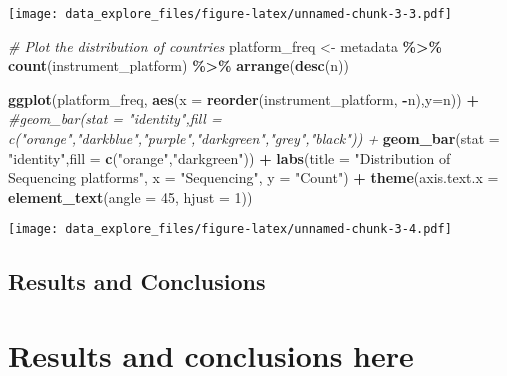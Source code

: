 \documentclass[
]{article}
\newenvironment{Shaded}{\begin{snugshade}}{\end{snugshade}}
\newcommand{\AttributeTok}[1]{\textcolor[rgb]{0.13,0.29,0.53}{#1}}
\newcommand{\CommentTok}[1]{\textcolor[rgb]{0.56,0.35,0.01}{\textit{#1}}}
\newcommand{\DecValTok}[1]{\textcolor[rgb]{0.00,0.00,0.81}{#1}}
\newcommand{\FunctionTok}[1]{\textcolor[rgb]{0.13,0.29,0.53}{\textbf{#1}}}
\newcommand{\NormalTok}[1]{#1}
\newcommand{\OtherTok}[1]{\textcolor[rgb]{0.56,0.35,0.01}{#1}}
\newcommand{\SpecialCharTok}[1]{\textcolor[rgb]{0.81,0.36,0.00}{\textbf{#1}}}
\newcommand{\StringTok}[1]{\textcolor[rgb]{0.31,0.60,0.02}{#1}}
\begin{document}
\texttt{[image: data\_explore\_files/figure-latex/unnamed-chunk-3-3.pdf]}

\begin{Shaded}
\begin{Highlighting}[]
\CommentTok{\# Plot the distribution of countries}
\NormalTok{platform\_freq }\OtherTok{\textless{}{-}}\NormalTok{ metadata }\SpecialCharTok{\%\textgreater{}\%}
  \FunctionTok{count}\NormalTok{(instrument\_platform) }\SpecialCharTok{\%\textgreater{}\%}
  \FunctionTok{arrange}\NormalTok{(}\FunctionTok{desc}\NormalTok{(n))}

\FunctionTok{ggplot}\NormalTok{(platform\_freq, }\FunctionTok{aes}\NormalTok{(}\AttributeTok{x =} \FunctionTok{reorder}\NormalTok{(instrument\_platform, }\SpecialCharTok{{-}}\NormalTok{n),}\AttributeTok{y=}\NormalTok{n)) }\SpecialCharTok{+}
  \CommentTok{\#geom\_bar(stat = "identity",fill = c("orange","darkblue","purple","darkgreen","grey","black")) +}
  \FunctionTok{geom\_bar}\NormalTok{(}\AttributeTok{stat =} \StringTok{"identity"}\NormalTok{,}\AttributeTok{fill =} \FunctionTok{c}\NormalTok{(}\StringTok{"orange"}\NormalTok{,}\StringTok{"darkgreen"}\NormalTok{)) }\SpecialCharTok{+}
  \FunctionTok{labs}\NormalTok{(}\AttributeTok{title =} \StringTok{"Distribution of Sequencing platforms"}\NormalTok{, }\AttributeTok{x =} \StringTok{"Sequencing"}\NormalTok{, }\AttributeTok{y =} \StringTok{"Count"}\NormalTok{) }\SpecialCharTok{+}
  \FunctionTok{theme}\NormalTok{(}\AttributeTok{axis.text.x =} \FunctionTok{element\_text}\NormalTok{(}\AttributeTok{angle =} \DecValTok{45}\NormalTok{, }\AttributeTok{hjust =} \DecValTok{1}\NormalTok{))}
\end{Highlighting}
\end{Shaded}

\texttt{[image: data\_explore\_files/figure-latex/unnamed-chunk-3-4.pdf]}

\hypertarget{results-and-conclusions}{%
\subsection{Results and Conclusions}\label{results-and-conclusions}}

\hypertarget{results-and-conclusions-here}{%
\section{Results and conclusions
here}\label{results-and-conclusions-here}}
\end{document}
